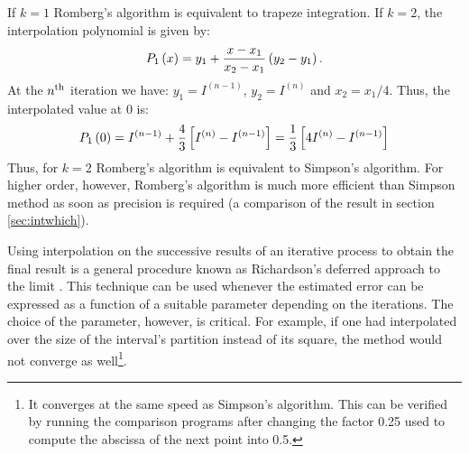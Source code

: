 \documentclass[twoside]{book}
\begin{document}
If $k=1$ Romberg's algorithm is equivalent to trapeze integration.
If $k=2$, the interpolation polynomial is given by:
\begin{equation}
P_1\left(x\right)=y_1+{x-x_1 \over x_2-x_1}\left(y_2-y_1\right).
\end{equation}
At the $n^{\mathop{\rm th}}$ iteration we have:
$y_1=I^{\left(n-1\right)}$, $y_2=I^{\left(n\right)}$ and
$x_2=x_1/4$. Thus, the interpolated value at 0 is:
\begin{equation}
P_1\left(0\right)=I^{\left(n-1\right)}+{4 \over
3}\left[I^{\left(n\right)}-I^{\left(n-1\right)}\right] ={1\over
3}\left[4I^{\left(n\right)}-I^{\left(n-1\right)}\right]
\end{equation}
Thus, for $k=2$ Romberg's algorithm is equivalent to Simpson's
algorithm. For higher order, however, Romberg's algorithm is much
more efficient than Simpson method as soon as precision is
required (\cf a comparison of the result in section
\ref{sec:intwhich}).

Using interpolation on the successive results of an iterative
process to obtain the final result is a general procedure known as
Richardson's deferred approach to the limit \cite{Press}. This
technique can be used whenever the estimated error can be
expressed as a function of a suitable parameter depending on the
iterations. The choice of the parameter, however, is critical. For
example, if one had interpolated over the size of the interval's
partition instead of its square, the method would not converge as
well\footnote{It converges at the same speed as Simpson's
algorithm. This can be verified by running the comparison programs
after changing the factor 0.25 used to compute the abscissa of the
next point into 0.5.}.
\end{document}

